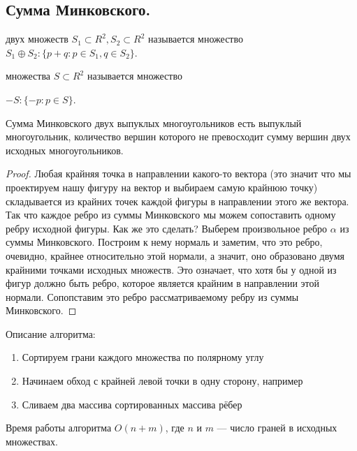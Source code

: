 \subsection{Сумма Минковского.}
\begin{definition}
   двух множеств $S_1 \subset R^2, S_2 \subset R^2$ называется множество
  $S_1 \oplus S_2 \colon \{p + q \colon p \in S_1, q \in S_2\}$.
\end{definition}

\begin{definition}
   множества $S \subset R^2$ называется множество 
  
  $-S \colon \{-p \colon p \in S\}$.
\end{definition}

\begin{theorem}
  Сумма Минковского двух выпуклых многоугольников есть выпуклый многоугольник, количество вершин
  которого не превосходит сумму вершин двух исходных многоугольников.
\end{theorem}
\begin{proof}
  Любая крайняя точка в направлении какого-то вектора (это значит что мы проектируем нашу фигуру на вектор и
  выбираем самую крайнюю точку) складывается из крайних точек каждой фигуры в направлении этого же вектора.
  Так что каждое ребро из суммы Минковского мы можем сопоставить одному ребру исходной фигуры. Как же 
  это сделать? Выберем произвольное ребро $\alpha$ из суммы Минковского. Построим к нему нормаль и заметим, что
  это ребро, очевидно, крайнее относительно этой нормали, а значит, оно образовано двумя крайними точками
  исходных множеств. Это означает, что хотя бы у одной из фигур должно быть ребро, которое
  является крайним в направлении этой нормали. Сопопставим это ребро рассматриваемому ребру из суммы
  Минковского.
\end{proof}

Описание алгоритма:
\begin{enumerate}
  \item Сортируем грани каждого множества по полярному углу
  \item Начинаем обход с крайней левой точки в одну сторону, например
  \item Сливаем два массива сортированных массива рёбер
\end{enumerate}

\begin{remark}
  Время работы алгоритма $O(n + m)$, где $n$ и $m$ --- число граней в исходных множествах.
\end{remark}

